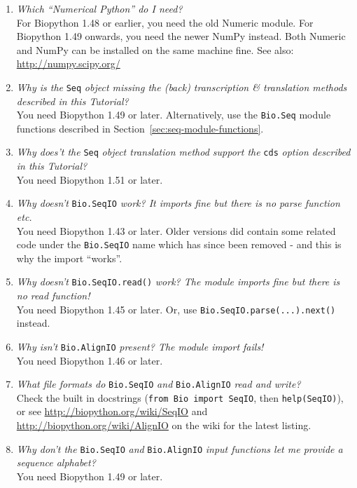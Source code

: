 \documentclass{report}
\begin{document}
\begin{enumerate}
  \item \emph{Which ``Numerical Python'' do I need?} \\
  For Biopython 1.48 or earlier, you need the old Numeric module.
  For Biopython 1.49 onwards, you need the newer NumPy instead.
  Both Numeric and NumPy can be installed on the same machine fine.
  See also: \url{http://numpy.scipy.org/}

  \item \emph{Why is the} \verb|Seq| \emph{object missing the (back) transcription \& translation methods described in this Tutorial?} \\
  You need Biopython 1.49 or later.  Alternatively, use the \verb|Bio.Seq| module functions described in Section~\ref{sec:seq-module-functions}.

  \item \emph{Why does't the} \verb|Seq| \emph{object translation method support the} \verb|cds| \emph{option described in this Tutorial?} \\
  You need Biopython 1.51 or later.

  \item \emph{Why doesn't} \verb|Bio.SeqIO| \emph{work? It imports fine but there is no parse function etc.} \\
  You need Biopython 1.43 or later.  Older versions did contain some related code under the \verb|Bio.SeqIO| name which has since been removed - and this is why the import ``works''.

  \item \emph{Why doesn't} \verb|Bio.SeqIO.read()| \emph{work? The module imports fine but there is no read function!} \\
  You need Biopython 1.45 or later.  Or, use \texttt{Bio.SeqIO.parse(...).next()} instead.

  \item \emph{Why isn't} \verb|Bio.AlignIO| \emph{present? The module import fails!} \\
  You need Biopython 1.46 or later.

  \item \emph{What file formats do} \verb|Bio.SeqIO| \emph{and} \verb|Bio.AlignIO| \emph{read and write?} \\
  Check the built in docstrings (\texttt{from Bio import SeqIO}, then \texttt{help(SeqIO)}), or see \url{http://biopython.org/wiki/SeqIO} and \url{http://biopython.org/wiki/AlignIO} on the wiki for the latest listing.
  
  \item \emph{Why don't the } \verb|Bio.SeqIO| \emph{and} \verb|Bio.AlignIO| \emph{input functions let me provide a sequence alphabet?} \\
  You need Biopython 1.49 or later.


\end{enumerate}
\end{document}
